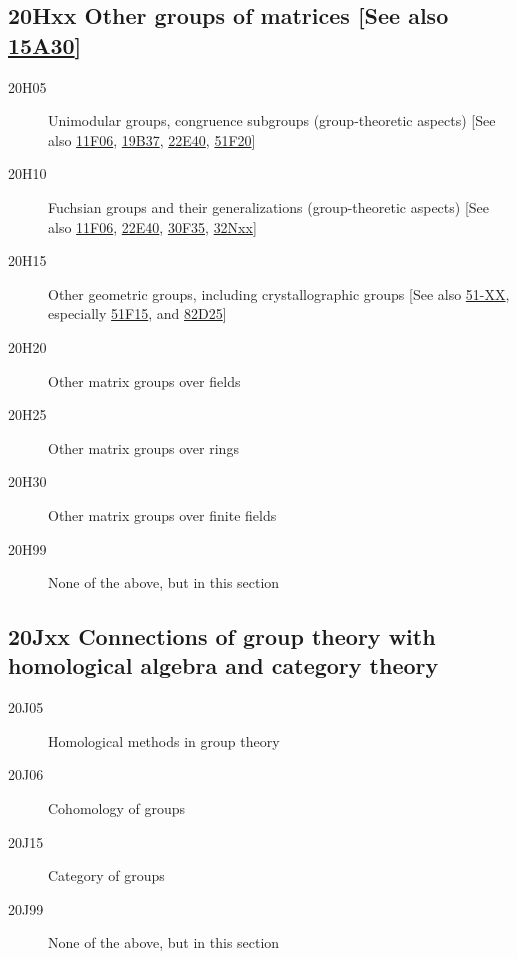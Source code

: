 \subsection*{20Hxx  Other groups of matrices [See also \hyperref[15A30]{15A30}] }\label{20Hxx}
\begin{description}  
\item [20H05]\label{20H05} Unimodular groups, congruence subgroups (group-theoretic aspects) [See also \hyperref[11F06]{11F06}, \hyperref[19B37]{19B37}, \hyperref[22E40]{22E40}, \hyperref[51F20]{51F20}]
\item [20H10]\label{20H10} Fuchsian groups and their generalizations (group-theoretic aspects) [See also \hyperref[11F06]{11F06}, \hyperref[22E40]{22E40}, \hyperref[30F35]{30F35}, \hyperref[32Nxx]{32Nxx}]
\item [20H15]\label{20H15} Other geometric groups, including crystallographic groups [See also \hyperref[51-XX]{51-XX}, especially  \hyperref[51F15]{51F15}, and \hyperref[82D25]{82D25}]
\item [20H20]\label{20H20} Other matrix groups over fields
\item [20H25]\label{20H25} Other matrix groups over rings
\item [20H30]\label{20H30} Other matrix groups over finite fields
\item [20H99]\label{20H99} None of the above, but in this section
\end{description}
\subsection*{20Jxx  Connections of group theory with homological algebra and category theory }\label{20Jxx}
\begin{description}  
\item [20J05]\label{20J05} Homological methods in group theory
\item [20J06]\label{20J06} Cohomology of groups
\item [20J15]\label{20J15} Category of groups
\item [20J99]\label{20J99} None of the above, but in this section
\end{description}

